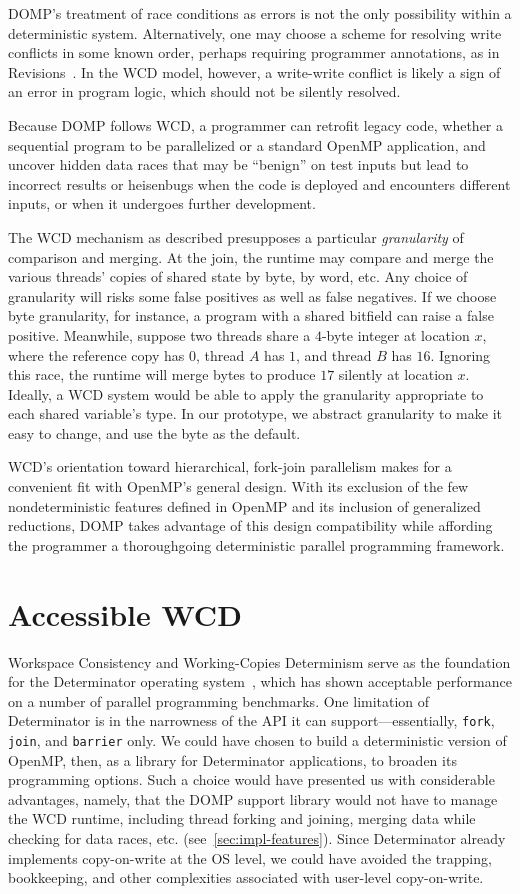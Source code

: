 DOMP's treatment of race conditions as errors is not the only possibility within a deterministic system.  Alternatively, one may choose a scheme for resolving write conflicts in some known order, perhaps requiring programmer annotations, as in Revisions~\cite{burckhardt10revisions}.  In the WCD model, however, a write-write conflict is likely a sign of an error in program logic, which should not be silently resolved.

Because DOMP follows WCD, a programmer can retrofit legacy code, whether a sequential program to be parallelized or a standard OpenMP application, and uncover hidden data races that may be ``benign'' on test inputs but lead to incorrect results or heisenbugs when the code is deployed and encounters different inputs, or when it undergoes further development.

The WCD mechanism as described presupposes a particular \textit{granularity} of comparison and merging.  At the join, the runtime may compare and merge the various threads' copies of shared state by byte, by word, etc.  Any choice of granularity will risks some false positives as well as false negatives.  If we choose byte granularity, for instance, a program with a shared bitfield can raise a false positive.  Meanwhile, suppose two threads share a $4$-byte integer at location $x$, where the reference copy has $0$, thread $A$ has $1$, and thread $B$ has $16$.  Ignoring this race, the runtime will merge bytes to produce $17$ silently at location $x$.  Ideally, a WCD system would be able to apply the granularity appropriate to each shared variable's type.  In our prototype, we abstract granularity to make it easy to change, and use the byte as the default.

WCD's orientation toward hierarchical, fork-join parallelism makes for a convenient fit with OpenMP's general design.  With its exclusion of the few nondeterministic features defined in OpenMP and its inclusion of generalized reductions, DOMP takes advantage of this design compatibility while affording the programmer a thoroughgoing deterministic parallel programming framework.
%
\section{Accessible WCD}
\label{sec:design-rationale}
%
Workspace Consistency and Working-Copies Determinism serve as the foundation for the Determinator operating system~\cite{ford10efficient}, which has shown acceptable performance on a number of parallel programming benchmarks.  One limitation of Determinator is in the narrowness of the API it can support---essentially, \texttt{fork}, \texttt{join}, and \texttt{barrier} only.  We could have chosen to build a deterministic version of OpenMP, then, as a library for Determinator applications, to broaden its programming options.  Such a choice would have presented us with considerable advantages, namely, that the DOMP support library would not have to manage the WCD runtime, including thread forking and joining, merging data while checking for data races, etc. (see~\ref{sec:impl-features}).  Since Determinator already implements copy-on-write at the OS level, we could have avoided the trapping, bookkeeping, and other complexities associated with user-level copy-on-write.  

